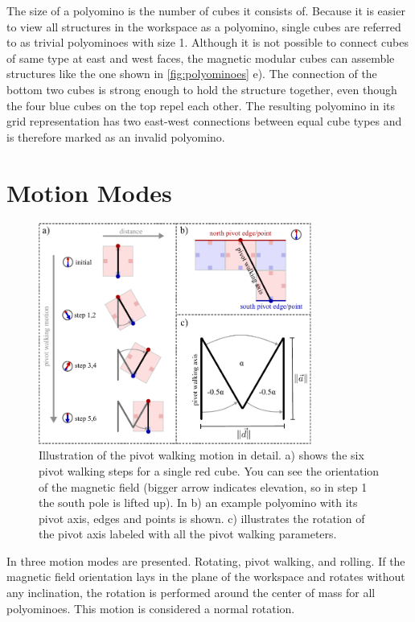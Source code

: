 The size of a polyomino is the number of cubes it consists of.
Because it is easier to view all structures in the workspace as a polyomino, single cubes are referred to as trivial polyominoes with size 1.
Although it is not possible to connect cubes of same type at east and west faces, the magnetic modular cubes can assemble structures like the one shown in \autoref{fig:polyominoes} e).
The connection of the bottom two cubes is strong enough to hold the structure together, even though the four blue cubes on the top repel each other.
The resulting polyomino in its grid representation has two east-west connections between equal cube types and is therefore marked as an invalid polyomino.



\section{Motion Modes}
\label{sec:motion}

\begin{figure}
	\centering
	\includegraphics[width=0.80\textwidth]{figures/pivot_walking.pdf}
	\caption[Illustration of the pivot walking motion]{Illustration of the pivot walking motion in detail. a) shows the six pivot walking steps for a single red cube. You can see the orientation of the magnetic field (bigger arrow indicates elevation, so in step 1 the south pole is lifted up). In b) an example polyomino with its pivot axis, edges and points is shown. c) illustrates the rotation of the pivot axis labeled with all the pivot walking parameters.}
	\label{fig:pivot_walking}
\end{figure}

In \cite{Bhattacharjee2022} three motion modes are presented. Rotating, pivot walking, and rolling.
If the magnetic field orientation lays in the plane of the workspace and rotates without any inclination, the rotation is performed around the center of mass for all polyominoes.
This motion is considered a normal rotation.


